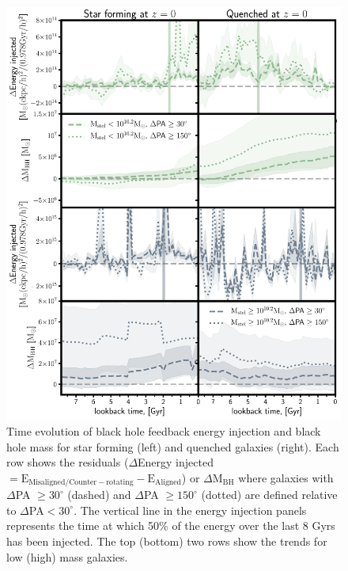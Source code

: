 \begin{figure}
	\includegraphics[width=\linewidth]{misalignment_BH/BH_props_only.pdf}
    \caption{Time evolution of black hole feedback energy injection and black hole mass for star forming (left) and quenched galaxies (right). Each row shows the residuals ($\Delta$Energy injected$\mathrm{ = E_{Misaligned/Counter-rotating} - E_{Aligned}}$) or $\Delta \mathrm{M_{BH}}$ where galaxies with $\Delta$PA $\geq 30^{\circ}$ (dashed) and $\Delta$PA $\geq 150^{\circ}$ (dotted) are defined relative to $\Delta$PA$ < 30^{\circ}$. The vertical line in the energy injection panels represents the time at which 50\% of the energy over the last 8 Gyrs has been injected. The top (bottom) two rows show the trends for low (high) mass galaxies.}
    \label{fig:BH_props}
\end{figure}

